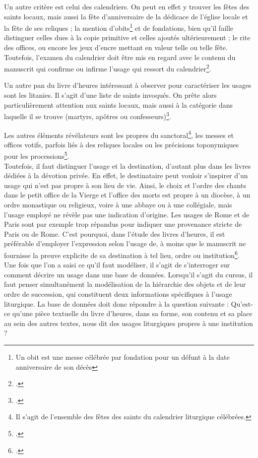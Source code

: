 \documentclass[a4paper,12pt,twoside]{book}
\begin{document}
	Un autre critère est celui des calendriers. On peut en effet y trouver les fêtes des saints locaux, mais aussi la fête d'anniversaire de la dédicace de l'église locale et la fête de ses reliques ; la mention d'obits\footnote{Un obit est une messe célébrée par fondation pour un défunt à la date anniversaire de son décès} et de fondations, bien qu'il faille distinguer  celles dues à la copie primitive et celles ajoutés ultérieurement ; le rite des offices, ou encore les jeux d'encre mettant en valeur telle ou telle fête. Toutefois, l'examen du calendrier doit être mis en regard avec le contenu du manuscrit qui confirme ou infirme l'usage qui ressort du calendrier\footcite{usages_lit}.
	
	Un autre pan du livre d'heures intéressant à observer pour caractériser les usages sont les litanies. Il s'agit d'une liste de saints invoqués. On prête alors particulièrement attention aux saints locaux, mais aussi à la catégorie dans laquelle il se trouve (martyrs, apôtres ou confesseurs)\footcite{usages_lit}. 
	
	Les autres éléments révélateurs sont les propres du sanctoral\footnote{Il s'agit de l'ensemble des fêtes des saints du calendrier liturgique célébrées.}, les messes et offices votifs, parfois liés à des reliques locales ou les précisions toponymiques pour les processions\footcite{usages_lit}. \\
	
	Toutefois, il faut distinguer l'usage et la destination, d'autant plus dans les livres dédiées à la dévotion privée. En effet, le destinataire peut vouloir s'inspirer d'un usage qui n'est pas propre à son lieu de vie. Ainsi, le choix et l'ordre des chants dans le petit office de la Vierge et l'office des morts est propre à un diocèse, à un ordre monastique ou religieux, voire à une abbaye ou à une collégiale, mais l'usage employé ne révèle pas une indication d'origine. Les usages de Rome et de Paris sont par exemple trop répandus pour indiquer une provenance stricte de Paris ou de Rome. C'est pourquoi, dans l'étude des livres d'heures, il est préférable d'employer l'expression \og selon l'usage de\fg{}, à moins que le manuscrit ne fournisse la preuve explicite de sa destination à tel lieu, ordre ou institution\footcite[p. 5]{initiation_man_lit}.\\
	
	Une fois que l'on a saisi ce qu'il faut modéliser, il s'agit de s'interroger sur comment décrire un usage dans une base de données. Lorsqu'il s'agit du cursus, il faut penser simultanément la modélisation de la hiérarchie des objets et de leur ordre de succession, qui constituent deux informations spécifiques à l’usage liturgique. La base de données doit donc répondre à la question suivante : Qu’est-ce qu'une pièce textuelle du livre d’heures, dans sa forme, son contenu et sa place au sein des autres textes, nous dit des usages liturgiques propres à une institution ? \\
	
\end{document}
